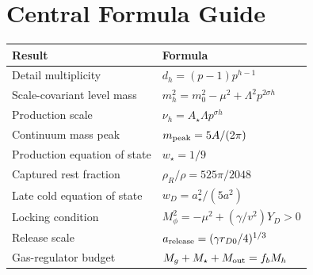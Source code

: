 \chapter{Central Formula Guide}\begin{longtable}{@{}P{0.30\textwidth}P{0.62\textwidth}@{}}\toprule Result & Formula\\\midrule Detail multiplicity & $d_h=(p-1)p^{h-1}$\\ Scale-covariant level mass & $m_h^2=m_0^2-\mu^2+\Lambda^2p^{2\sigma h}$\\ Production scale & $\nu_h=A_\star\Lambda p^{\sigma h}$\\ Continuum mass peak & $m_{\rm peak}=5A/(2\pi)$\\ Production equation of state & $w_\star=1/9$\\ Captured rest fraction & $\rho_R/\rho=525\pi/2048$\\ Late cold equation of state & $w_D=a_\star^2/(5a^2)$\\ Locking condition & $M_\phi^2=-\mu^2+(\gamma/v^2)Y_D>0$\\ Release scale & $a_{\rm release}=(\gamma r_{D0}/4)^{1/3}$\\ Gas-regulator budget & $M_g+M_\star+M_{\rm out}=f_bM_h$\\\bottomrule\end{longtable}
